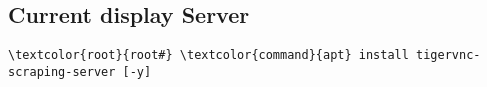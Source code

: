 \documentclass[10pt, a4paper, onecolumn, openany]{book} %
\begin{document}
\subsection{Current display Server}
\begin{enumerate}
\begin{Verbatim}[commandchars=\\\{\}]
\textcolor{root}{root#} \textcolor{command}{apt} install tigervnc-scraping-server [-y]
\end{Verbatim}
\end{enumerate}
\end{document}
